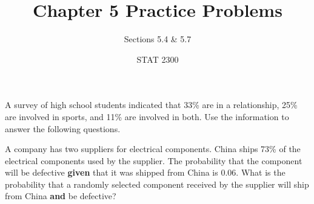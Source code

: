 \documentclass[noanswers]{exam}
\title{Chapter 5 Practice Problems}
\author{Sections 5.4 \& 5.7}
\date{STAT 2300}
\begin{document}
%

\begin{questions} 
		
	\question A survey of high school students indicated that 33\% are in a relationship, 25\% are involved in sports, and 11\% are involved in both. Use the information to answer the following questions.

\vspace{3mm}


\question A company has two suppliers for electrical components. China ships 73\% of the electrical components used by the supplier. The probability that the component will be defective \textbf{given} that it was shipped from China is 0.06. What is the probability that a randomly selected component received by the supplier will ship from China \textbf{and} be defective?


\end{questions}
\end{document}
